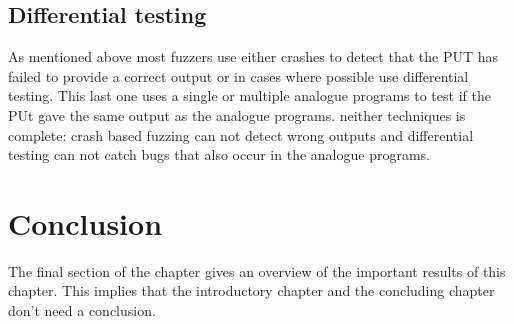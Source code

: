 \subsection{Differential testing}
As mentioned above most fuzzers use either crashes to detect that the PUT has failed to provide a correct output or in cases where possible use differential testing. This last one uses a single or multiple analogue programs to test if the PUt gave the same output as the analogue programs. neither techniques is complete: crash based fuzzing can not detect wrong outputs and differential testing can not catch bugs that also occur in the analogue programs.






\section{Conclusion}
The final section of the chapter gives an overview of the important results
of this chapter. This implies that the introductory chapter and the
concluding chapter don't need a conclusion.



